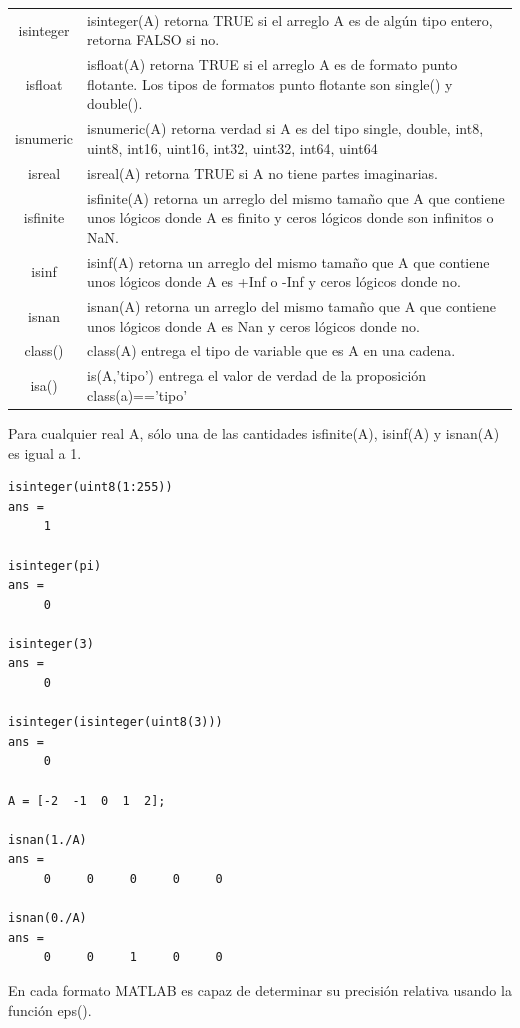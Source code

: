 \documentclass[12pt,letterpaper]{article}
\begin{document}
\begin{longtable}{|c||p{}|}
\hline
isinteger 	&	isinteger(A) retorna TRUE si el arreglo A es de alg\'un tipo entero, retorna FALSO  si no. \\
isfloat 	& 	isfloat(A) retorna TRUE si el arreglo A es de formato punto flotante. Los tipos de formatos punto flotante son single() y double(). \\
isnumeric	& 	isnumeric(A) retorna verdad si A es del tipo single, double, int8, uint8, int16, uint16, int32, uint32, int64, uint64 \\
isreal 		& 	isreal(A) retorna TRUE si A no tiene partes imaginarias. \\
isfinite	& 	isfinite(A)  retorna un arreglo del mismo tama\~{n}o que A que contiene unos l\'ogicos donde A es finito y ceros l\'ogicos donde son infinitos o NaN. \\
isinf 		& 	isinf(A)  retorna un arreglo del mismo tama\~{n}o que A que contiene unos l\'ogicos donde A es +Inf o -Inf y ceros l\'ogicos donde no. \\
isnan		& 	isnan(A)  retorna un arreglo del mismo tama\~{n}o que A que contiene unos l\'ogicos donde A es Nan y ceros l\'ogicos donde no.\\
class()		& 	class(A) entrega el tipo de variable que es A en una cadena. \\
isa()		&   is(A,'tipo') entrega el valor de verdad de la proposici\'on class(a)=='tipo'
		\\
\hline
\end{longtable}

Para cualquier real A, s\'olo una de las cantidades isfinite(A), isinf(A) y isnan(A) es igual a 1.

\begin{verbatim}
isinteger(uint8(1:255))
ans =
     1

isinteger(pi)
ans =
     0

isinteger(3)
ans =
     0

isinteger(isinteger(uint8(3)))
ans =
     0

A = [-2  -1  0  1  2];

isnan(1./A)
ans =
     0     0     0     0     0

isnan(0./A)
ans =
     0     0     1     0     0
\end{verbatim}

En cada formato MATLAB es capaz de determinar su precisi\'on relativa usando la funci\'on eps().
\end{document}

